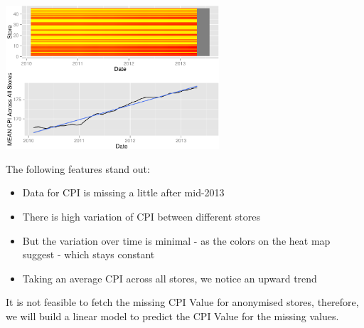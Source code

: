 \documentclass[]{article}
\newenvironment{Shaded}{\begin{snugshade}}{\end{snugshade}}
\newcommand{\KeywordTok}[1]{\textcolor[rgb]{0.13,0.29,0.53}{\textbf{{#1}}}}
\newcommand{\DataTypeTok}[1]{\textcolor[rgb]{0.13,0.29,0.53}{{#1}}}
\newcommand{\DecValTok}[1]{\textcolor[rgb]{0.00,0.00,0.81}{{#1}}}
\newcommand{\StringTok}[1]{\textcolor[rgb]{0.31,0.60,0.02}{{#1}}}
\newcommand{\NormalTok}[1]{{#1}}
\begin{document}
\includegraphics[width=300px]{PredictingWeeklySalesAtWalmart_files/figure-latex/CPIMissingHeatMap-1}

The following features stand out:

\begin{itemize}
\itemsep1pt\parskip0pt
\item
  Data for CPI is missing a little after mid-2013
\item
  There is high variation of CPI between different stores
\item
  But the variation over time is minimal - as the colors on the heat map
  suggest - which stays constant
\item
  Taking an average CPI across all stores, we notice an upward trend
\end{itemize}

It is not feasible to fetch the missing CPI Value for anonymised stores,
therefore, we will build a linear model to predict the CPI Value for the
missing values.

\begin{Shaded}
\end{Shaded}
\end{document}
